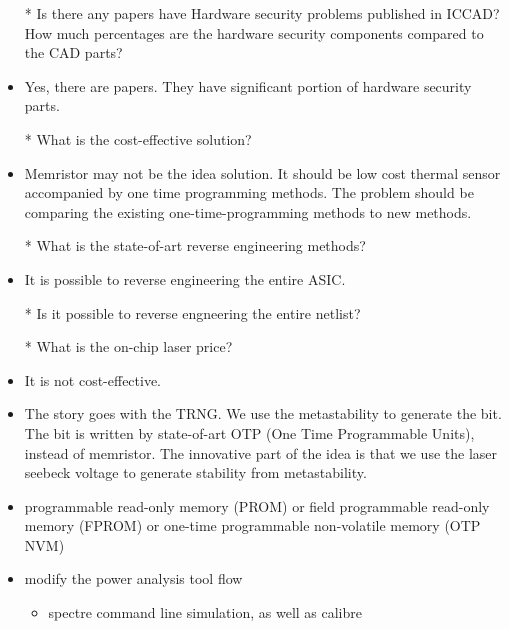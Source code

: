 \documentclass[]{article}
\begin{document}
\begin{itemize}
                \item [*] Is there any papers have Hardware security problems
                published in ICCAD? How much percentages are the hardware
                security components compared to the CAD parts?
                \item Yes, there are papers. They have significant portion
                of hardware security parts.
                \item [*] What is the cost-effective solution?
                \item Memristor may not be the idea solution. It should be low
                cost thermal sensor accompanied by one time programming methods.
                The problem should be comparing the existing
                one-time-programming methods to new methods.
                \item [*] What is the state-of-art reverse engineering methods?
                \item It is possible to reverse engineering the entire ASIC.
                \item [*] Is it possible to reverse engneering the entire
                netlist?
                \item [*] What is the on-chip laser price?
                \item It is not cost-effective.
                \item {\color{red}The story goes with the TRNG. We use the metastability
                to generate the bit. The bit is written by state-of-art OTP (One
                Time Programmable Units), instead of memristor. The innovative
                part of the idea is that we use the laser seebeck voltage to
                generate stability from metastability.}
                \item programmable read-only memory (PROM) or field programmable
                read-only memory (FPROM) or one-time programmable non-volatile
                memory (OTP NVM) 
                \item modify the power analysis tool flow
                \begin{itemize}
                    \item spectre command line simulation, as well as calibre
                \end{itemize}
                
        \end{itemize}
\end{document}
